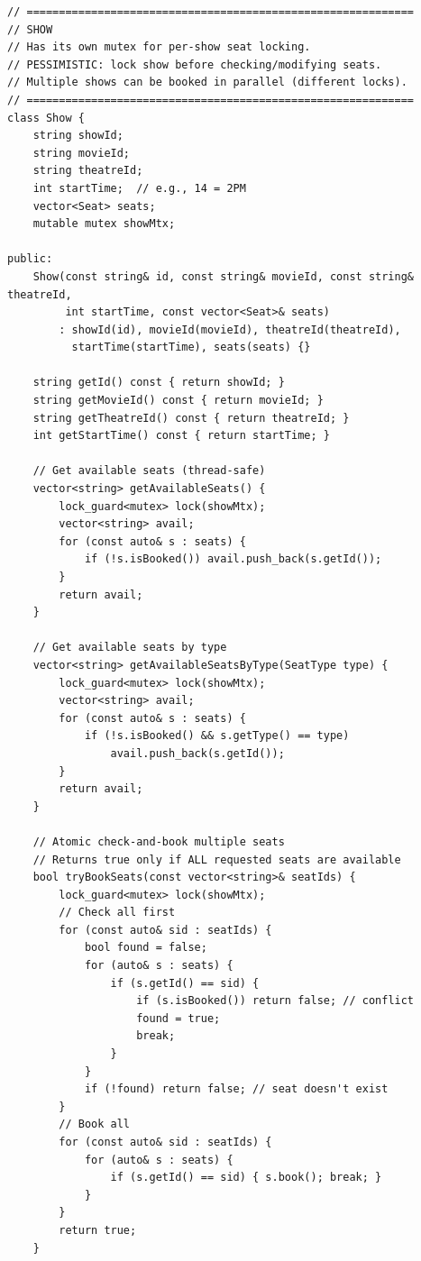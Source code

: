 \documentclass[11pt,a4paper]{article}
\begin{document}
\begin{lstlisting}[title={\texttt{models.hpp}}]
// ============================================================
// SHOW
// Has its own mutex for per-show seat locking.
// PESSIMISTIC: lock show before checking/modifying seats.
// Multiple shows can be booked in parallel (different locks).
// ============================================================
class Show {
    string showId;
    string movieId;
    string theatreId;
    int startTime;  // e.g., 14 = 2PM
    vector<Seat> seats;
    mutable mutex showMtx;

public:
    Show(const string& id, const string& movieId, const string& theatreId,
         int startTime, const vector<Seat>& seats)
        : showId(id), movieId(movieId), theatreId(theatreId),
          startTime(startTime), seats(seats) {}

    string getId() const { return showId; }
    string getMovieId() const { return movieId; }
    string getTheatreId() const { return theatreId; }
    int getStartTime() const { return startTime; }

    // Get available seats (thread-safe)
    vector<string> getAvailableSeats() {
        lock_guard<mutex> lock(showMtx);
        vector<string> avail;
        for (const auto& s : seats) {
            if (!s.isBooked()) avail.push_back(s.getId());
        }
        return avail;
    }

    // Get available seats by type
    vector<string> getAvailableSeatsByType(SeatType type) {
        lock_guard<mutex> lock(showMtx);
        vector<string> avail;
        for (const auto& s : seats) {
            if (!s.isBooked() && s.getType() == type)
                avail.push_back(s.getId());
        }
        return avail;
    }

    // Atomic check-and-book multiple seats
    // Returns true only if ALL requested seats are available
    bool tryBookSeats(const vector<string>& seatIds) {
        lock_guard<mutex> lock(showMtx);
        // Check all first
        for (const auto& sid : seatIds) {
            bool found = false;
            for (auto& s : seats) {
                if (s.getId() == sid) {
                    if (s.isBooked()) return false; // conflict
                    found = true;
                    break;
                }
            }
            if (!found) return false; // seat doesn't exist
        }
        // Book all
        for (const auto& sid : seatIds) {
            for (auto& s : seats) {
                if (s.getId() == sid) { s.book(); break; }
            }
        }
        return true;
    }


\end{lstlisting}
\end{document}
